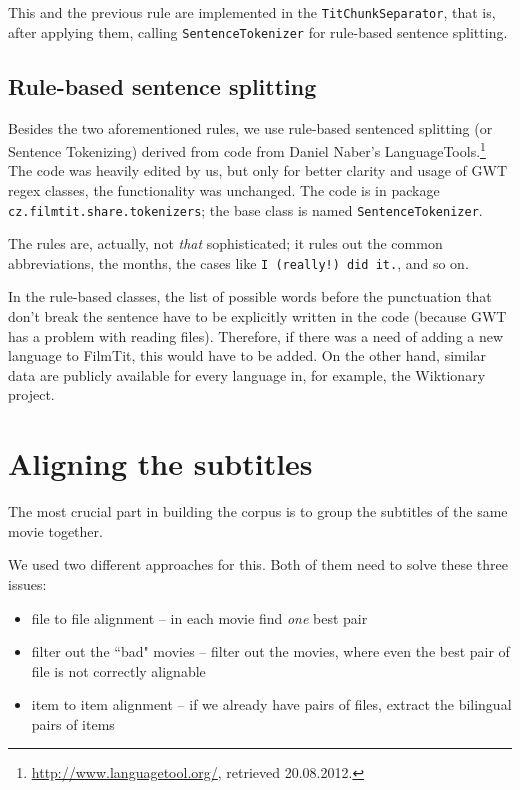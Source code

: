 This and the previous rule are implemented in the \texttt{TitChunkSeparator}, that is, after applying them, calling \texttt{SentenceTokenizer} for rule-based sentence splitting.

\subsection*{Rule-based sentence splitting}
Besides the two aforementioned rules, we use rule-based sentenced splitting (or Sentence Tokenizing) derived from code from Daniel Naber's LanguageTools.\footnote{\url{http://www.languagetool.org/}, retrieved 20.08.2012.} The code was heavily edited by us, but only for better clarity and usage of GWT regex classes, the functionality was unchanged. The code is in package \texttt{cz.filmtit.share.tokenizers}; the base class is named \texttt{SentenceTokenizer}.

The rules are, actually, not \emph{that} sophisticated; it rules out the common abbreviations, the months, the cases like \texttt{I (really!) did it.}, and so on.

In the rule-based classes, the list of possible words before the punctuation that don't break the sentence have to be explicitly written in the code (because GWT has a problem with reading files). Therefore, if there was a need of adding a new language to FilmTit, this would have to be added. On the other hand, similar data are publicly available for every language in, for example, the Wiktionary project.

\section{Aligning the subtitles}
\label{sec:aligning_subtitles}
The most crucial part in building the corpus is to group the subtitles of the same movie together.

We used two different approaches for this. Both of them need to solve these three issues:
\begin{itemize}
    \item file to file alignment -- in each movie find \emph{one} best pair
    \item filter out the ``bad" movies -- filter out the movies, where even the best pair of file is not correctly alignable
    \item item to item alignment -- if we already have pairs of files, extract the bilingual pairs of items 
\end{itemize}

